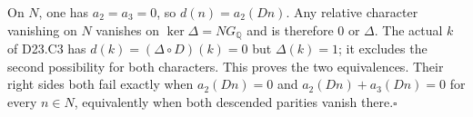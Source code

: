 On $N$, one has $a_2=a_3=0$, so
$d(n)=a_2(Dn)$.  Any relative character vanishing on $N$
vanishes on $\ker\Delta=N G_{\mathbb Q}$ and is therefore
$0$ or $\Delta$.  The actual $k$ of D23.C3 has
$d(k)=(\Delta\circ D)(k)=0$ but $\Delta(k)=1$;
it excludes the second possibility for both characters.
This proves the two equivalences.  Their right sides both
fail exactly when $a_2(Dn)=0$ and
$a_2(Dn)+a_3(Dn)=0$ for every $n\in N$, equivalently when
both descended parities vanish there.\hfill$\square$
